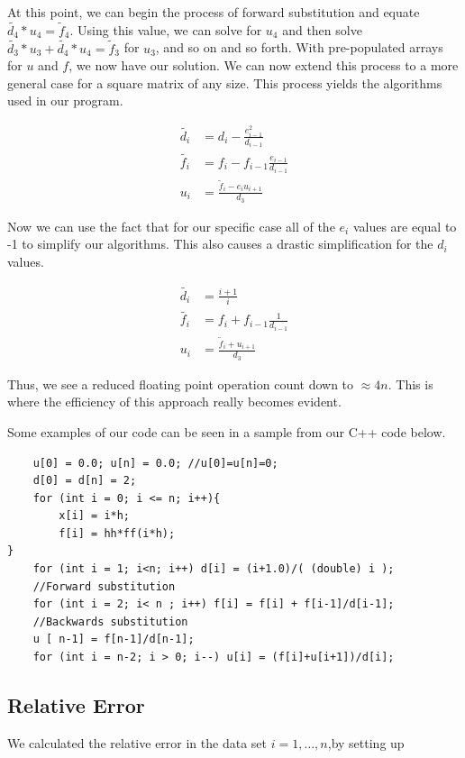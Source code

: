\documentclass{article}
\begin{document}
At this point, we can begin the process of forward substitution and equate $\tilde{d_{4}} * u_{4} = \tilde{f}_{4}$. Using this value, we can solve for $u_{4}$ and then solve $\tilde{d_{3}} * u_{3} + \tilde{d_{4}} * u_{4} = \tilde{f}_{3}$ for $u_{3}$, and so on and so forth. With pre-populated arrays for $u$ and $f$, we now have our solution. We can now extend this process to a more general case for a square matrix of any size. This process yields the algorithms used in our program.


\begin{align}
\tilde{d_{i}} &= d_{i}-\frac{e_{i-1}^{2}}{d_{i-1}} \\
\tilde{f_{i}} &= f_{i} - f_{i-1} \frac{e_{i-1}}{d_{i-1}} \\
u_{i} &= \frac{	\tilde{f}_{i} - e_{i}u_{i+1}}{d_{3}}
\end{align}

Now we can use the fact that for our specific case all of the $e_{i}$ values are equal to -1 to simplify our algorithms. This also causes a drastic simplification for the $d_{i}$ values. 

\begin{align}
\tilde{d_{i}} &= \frac{i+1}{i} \\
\tilde{f_{i}} &= f_{i} + f_{i-1} \frac{1}{d_{i-1}} \\
u_{i} &= \frac{	\tilde{f}_{i} + u_{i+1}}{d_{3}}
\end{align}

Thus, we see a reduced floating point operation count down to $\approx 4n$. This is where the efficiency of this approach really becomes evident. 

Some examples of our code can be seen in a sample from our C++ code below.
\begin{lstlisting}
	u[0] = 0.0; u[n] = 0.0; //u[0]=u[n]=0;
	d[0] = d[n] = 2;
	for (int i = 0; i <= n; i++){
		x[i] = i*h;
		f[i] = hh*ff(i*h);
}
	for (int i = 1; i<n; i++) d[i] = (i+1.0)/( (double) i );
	//Forward substitution
	for (int i = 2; i< n ; i++) f[i] = f[i] + f[i-1]/d[i-1];
	//Backwards substitution
	u [ n-1] = f[n-1]/d[n-1];
	for (int i = n-2; i > 0; i--) u[i] = (f[i]+u[i+1])/d[i];
\end{lstlisting}


\subsection{Relative Error}
We calculated the relative error in the data set $i=1,\dots, n$,by setting up
\end{document}
